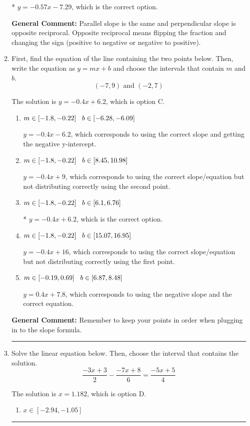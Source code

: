\documentclass{extbook}[14pt]
\newcommand{\litem}[1]{\item #1

\rule{\textwidth}{0.4pt}}
\begin{document}
\begin{enumerate}
{\begin{enumerate}[label=\Alph*.]
* $y = -0.57x - 7.29$, which is the correct option.
\end{enumerate}

\textbf{General Comment:} Parallel slope is the same and perpendicular slope is opposite reciprocal. Opposite reciprocal means flipping the fraction and changing the sign (positive to negative or negative to positive).
}
\litem{
First, find the equation of the line containing the two points below. Then, write the equation as $ y=mx+b $ and choose the intervals that contain $m$ and $b$.
\[ (-7, 9) \text{ and } (-2, 7) \]

The solution is \( y = -0.4x + 6.2 \), which is option C.\begin{enumerate}[label=\Alph*.]
\item \( m \in [-1.8, -0.22] \hspace*{3mm} b \in [-6.28, -6.09] \)

 $y = -0.4x -6.2$, which corresponds to using the correct slope and getting the negative y-intercept.
\item \( m \in [-1.8, -0.22] \hspace*{3mm} b \in [8.45, 10.98] \)

 $y = -0.4x + 9$, which corresponds to using the correct slope/equation but not distributing correctly using the second point.
\item \( m \in [-1.8, -0.22] \hspace*{3mm} b \in [6.1, 6.76] \)

* $y = -0.4x + 6.2$, which is the correct option.
\item \( m \in [-1.8, -0.22] \hspace*{3mm} b \in [15.07, 16.95] \)

 $y = -0.4x + 16$, which corresponds to using the correct slope/equation but not distributing correctly using the first point.
\item \( m \in [-0.19, 0.69] \hspace*{3mm} b \in [6.87, 8.48] \)

 $y = 0.4x + 7.8$, which corresponds to using the negative slope and the correct equation.
\end{enumerate}

\textbf{General Comment:} Remember to keep your points in order when plugging in to the slope formula.
}
\litem{
Solve the linear equation below. Then, choose the interval that contains the solution.
\[ \frac{-3x + 3}{2} - \frac{-7x + 8}{6} = \frac{-5x + 5}{4} \]

The solution is \( x = 1.182 \), which is option D.\begin{enumerate}[label=\Alph*.]
\item \( x \in [-2.94, -1.05] \)


\end{enumerate}}
\end{enumerate}
\end{document}
